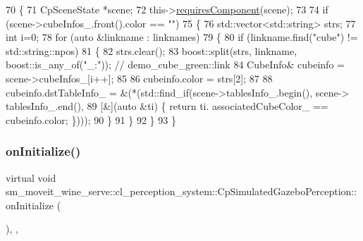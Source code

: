 \begin{DoxyCode}
70             \{
71                 CpSceneState *scene;
72                 this->\hyperlink{classsmacc_1_1ISmaccComponent_aa06d58b1dcec3c513ca2edddfd3847ec}{requiresComponent}(scene);
73 
74                 \textcolor{keywordflow}{if} (scene->cubeInfos\_.front().color == \textcolor{stringliteral}{""})
75                 \{
76                     std::vector<std::string> strs;
77                     \textcolor{keywordtype}{int} i=0;
78                     \textcolor{keywordflow}{for} (\textcolor{keyword}{auto} &linkname : linknames)
79                     \{
80                         \textcolor{keywordflow}{if} (linkname.find(\textcolor{stringliteral}{"cube"}) != std::string::npos)
81                         \{
82                             strs.clear();
83                             boost::split(strs, linkname, boost::is\_any\_of(\textcolor{stringliteral}{"\_:"})); \textcolor{comment}{// demo\_cube\_green::link}
84                             CubeInfo& cubeinfo = scene->cubeInfos\_[i++];
85 
86                             cubeinfo.color = strs[2];
87 
88                             cubeinfo.dstTableInfo\_ = &(*(std::find\_if(scene->tablesInfo\_.begin(), scene->
      tablesInfo\_.end(),
89                                                                       [&](\textcolor{keyword}{auto} &ti) \{ \textcolor{keywordflow}{return} ti.
      associatedCubeColor\_ == cubeinfo.color; \})));
90                         \}
91                     \}
92                 \}
93             \}
\end{DoxyCode}
\mbox{\label{classsm__moveit__wine__serve_1_1cl__perception__system_1_1CpSimulatedGazeboPerception_ad2360e1481edc4bd5732bb0e6deacea6}} 
\subsubsection{\texorpdfstring{on\+Initialize()}{onInitialize()}}
{\footnotesize\ttfamily virtual void sm\+\_\+moveit\+\_\+wine\+\_\+serve\+::cl\+\_\+perception\+\_\+system\+::\+Cp\+Simulated\+Gazebo\+Perception\+::on\+Initialize (\begin{DoxyParamCaption}{ }\end{DoxyParamCaption})\hspace{0.3cm}{\ttfamily [inline]}, {\ttfamily [override]}, {\ttfamily [virtual]}}



